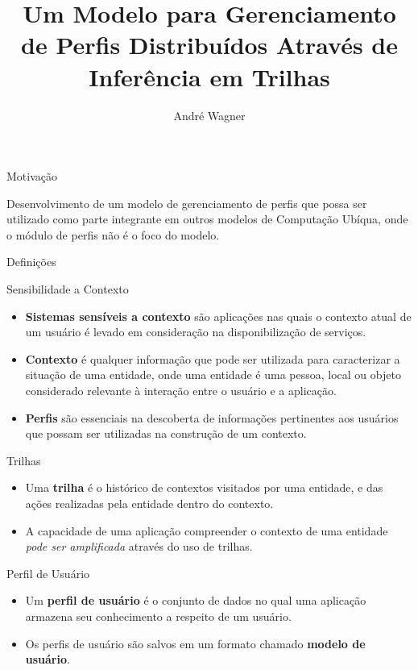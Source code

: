 \documentclass{beamer}
\title[Gerenciamento de Perfis]{Um Modelo para Gerenciamento de Perfis Distribuídos Através de Inferência em Trilhas}
\author{André Wagner}
\institute[UNISINOS]{
  Universidade do Vale do Rio dos Sinos (UNISINOS) \\
  PIPCA -- Mestrado em Computação Aplicada\\[1ex]
  \texttt{andre.nho@gmail.com}
}
\begin{document}

\begin{frame}[plain]
  \titlepage
\end{frame}


\begin{frame}{Motivação}

{\large Desenvolvimento de um modelo de gerenciamento de perfis que possa ser utilizado como parte integrante em outros modelos de Computação Ubíqua, onde o módulo de perfis não é o foco do modelo.}

\end{frame}


\begin{frame}[allowframebreaks]{Definições}

  \begin{block}{Sensibilidade a Contexto}
    \begin{itemize}
      \item \textbf{Sistemas sensíveis a contexto} são aplicações nas quais o contexto atual de um usuário é levado em consideração na disponibilização de serviços.
      \item \textbf{Contexto} é qualquer informação que pode ser utilizada para caracterizar a situação de uma entidade, onde uma entidade é uma pessoa, local ou objeto considerado relevante à interação entre o usuário e a aplicação. \cite{dey2001}
      \item \textbf{Perfis} são essenciais na descoberta de informações pertinentes aos usuários que possam ser utilizadas na construção de um contexto.
    \end{itemize}
  \end{block}

  \begin{block}{Trilhas}
    \begin{itemize}
      \item Uma \textbf{trilha} é o histórico de contextos visitados por uma entidade, e das ações realizadas pela entidade dentro do contexto. \cite{silva09}
      \item A capacidade de uma aplicação compreender o contexto de uma entidade \emph{pode ser amplificada} através do uso de trilhas.
    \end{itemize}
  \end{block}

  \begin{block}{Perfil de Usuário}
    \begin{itemize}
      \item Um \textbf{perfil de usuário} é o conjunto de dados no qual uma aplicação armazena seu conhecimento a respeito de um usuário. 
      \item Os perfis de usuário são salvos em um formato chamado \textbf{modelo de usuário}.
    \end{itemize}
  \end{block}


\end{frame}
\end{document}
